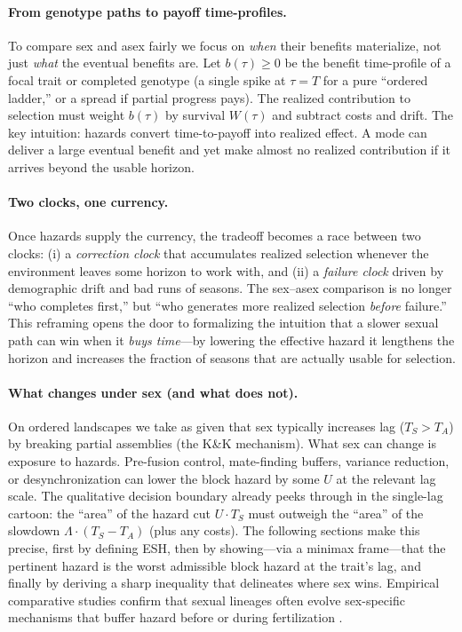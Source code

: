 \documentclass[11pt]{article}
\theoremstyle{upright}
\begin{document}
\paragraph{From genotype paths to payoff time-profiles.}
To compare sex and asex fairly we focus on \emph{when} their benefits materialize, not just \emph{what} the eventual benefits are. Let $b(\tau)\ge0$ be the benefit time-profile of a focal trait or completed genotype (a single spike at $\tau=T$ for a pure “ordered ladder,” or a spread if partial progress pays). The realized contribution to selection must weight $b(\tau)$ by survival $W(\tau)$ and subtract costs and drift. The key intuition: hazards convert time-to-payoff into realized effect. A mode can deliver a large eventual benefit and yet make almost no realized contribution if it arrives beyond the usable horizon.

\paragraph{Two clocks, one currency.}
Once hazards supply the currency, the tradeoff becomes a race between two clocks: (i) a \emph{correction clock} that accumulates realized selection whenever the environment leaves some horizon to work with, and (ii) a \emph{failure clock} driven by demographic drift and bad runs of seasons. The sex–asex comparison is no longer “who completes first,” but “who generates more realized selection \emph{before} failure.” This reframing opens the door to formalizing the intuition that a slower sexual path can win when it \emph{buys time}—by lowering the effective hazard it lengthens the horizon and increases the fraction of seasons that are actually usable for selection. 

\paragraph{What changes under sex (and what does not).}
On ordered landscapes we take as given that sex typically increases lag ($T_S>T_A$) by breaking partial assemblies (the K\&K mechanism). What sex can change is exposure to hazards. Pre-fusion control, mate-finding buffers, variance reduction, or desynchronization can lower the block hazard by some $U$ at the relevant lag scale. The qualitative decision boundary already peeks through in the single-lag cartoon: the “area” of the hazard cut $U\cdot T_S$ must outweigh the “area” of the slowdown $\Lambda\cdot(T_S-T_A)$ (plus any costs). The following sections make this precise, first by defining ESH, then by showing—via a minimax frame—that the pertinent hazard is the worst admissible block hazard at the trait’s lag, and finally by deriving a sharp inequality that delineates where sex wins. Empirical comparative studies confirm that sexual lineages often evolve sex-specific mechanisms 
that buffer hazard before or during fertilization \citep{Promislow1992, Maklakov2013}.
\end{document}
